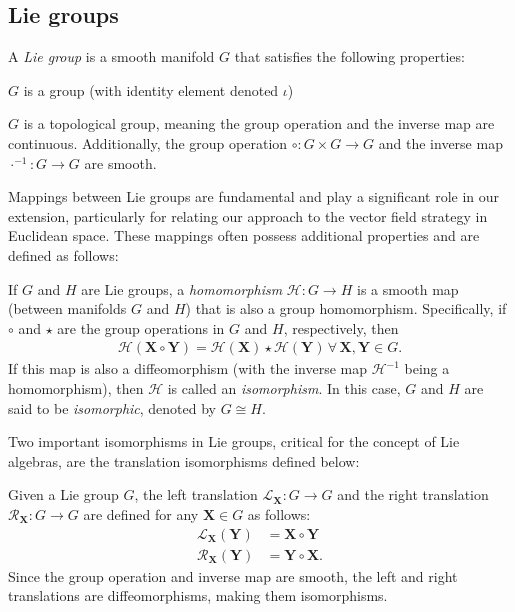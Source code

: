 \subsection{Lie groups}
\begin{definition}
    A \emph{Lie group} is a smooth manifold $G$ that satisfies the following properties:
    \begin{property}
        \item $G$ is a group (with identity element denoted $\iota$)
        \item $G$ is a topological group, meaning the group operation and the inverse map are continuous. Additionally, the group operation $\circ: G\times G\to G$ and the inverse map $\cdot^{-1}: G\to G$ are smooth.
    \end{property}
\end{definition}

Mappings between Lie groups are fundamental and play a significant role in our extension, particularly for relating our approach to the vector field strategy in Euclidean space. These mappings often possess additional properties and are defined as follows:
\begin{definition}
    If $G$ and $H$ are Lie groups, a \emph{homomorphism} $\mathcal{H}: G\to H$ is a smooth map (between manifolds $G$ and $H$) that is also a group homomorphism. Specifically, if $\circ$ and $\star$ are the group operations in $G$ and $H$, respectively, then
    \begin{align*}
        \mathcal{H}(\mathbf{X}\circ\mathbf{Y}) = \mathcal{H}(\mathbf{X})\star\mathcal{H}(\mathbf{Y})\,\forall\,\mathbf{X},\mathbf{Y}\in G.
    \end{align*}
    If this map is also a diffeomorphism (with the inverse map $\mathcal{H}^{-1}$ being a homomorphism), then $\mathcal{H}$ is called an \emph{isomorphism}. In this case, $G$ and $H$ are said to be \emph{isomorphic}, denoted by $G\cong H$.
\end{definition}

Two important isomorphisms in Lie groups, critical for the concept of Lie algebras, are the translation isomorphisms defined below:
\begin{definition}
    Given a Lie group $G$, the left translation $\mathcal{L}_{\mathbf{X}}: G\to G$ and the right translation $\mathcal{R}_{\mathbf{X}}: G\to G$ are defined for any $\mathbf{X}\in G$ as follows:
    \begin{align}
        \mathcal{L}_{\mathbf{X}}(\mathbf{Y}) &= \mathbf{X}\circ\mathbf{Y}\\
        \mathcal{R}_{\mathbf{X}}(\mathbf{Y}) &= \mathbf{Y}\circ\mathbf{X}.
    \end{align}
    Since the group operation and inverse map are smooth, the left and right translations are diffeomorphisms, making them isomorphisms.
\end{definition}

